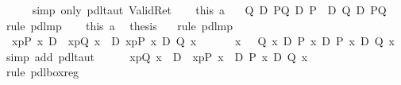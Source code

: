 \begin{isabellebody}
\ \ \ \ \isamarkupfalse%
\ {\isacharparenleft}simp\ only{\isacharcolon}\ pdl{\isacharunderscore}taut\ Valid{\isacharunderscore}Ret{\isacharparenright}\isanewline
\ \ \isamarkupfalse%
\ this\ a{}\ \isamarkupfalse%
\ {\isachardoublequote}{\isasymturnstile}\ {\isacharparenleft}{\isacharquery}Q\ {\isasymlongrightarrow}\isactrlsub D\ {\isacharquery}PQ{\isacharparenright}\ {\isasymlongrightarrow}\isactrlsub D\ {\isacharparenleft}{\isacharquery}P\ \ {\isasymor}\isactrlsub D\ {\isacharquery}Q\ {\isasymlongrightarrow}\isactrlsub D\ {\isacharquery}PQ{\isacharparenright}{\isachardoublequote}\ \isamarkupfalse%
\ {\isacharparenleft}rule\ pdl{\isacharunderscore}mp{\isacharparenright}\isanewline
\ \ \isamarkupfalse%
\ this\ a{}\ \isamarkupfalse%
\ {\isacharquery}thesis\ \ \isamarkupfalse%
\ {\isacharparenleft}rule\ pdl{\isacharunderscore}mp{\isacharparenright}\isanewline
\isamarkupfalse%
\isanewline
\isanewline
\isamarkupfalse%
\ {\isachardoublequote}{\isasymturnstile}\ {\isasymlangle}x{\isasymleftarrow}p{\isasymrangle}{\isacharparenleft}P\ x{\isacharparenright}\ {\isasymand}\isactrlsub D\ {\isacharbrackleft}{\isacharhash}\ x{\isasymleftarrow}p{\isacharbrackright}{\isacharparenleft}Q\ x{\isacharparenright}\ \ {\isasymlongrightarrow}\isactrlsub D\ {\isasymlangle}x{\isasymleftarrow}p{\isasymrangle}{\isacharparenleft}P\ x\ {\isasymand}\isactrlsub D\ Q\ x{\isacharparenright}{\isachardoublequote}\isanewline
\isamarkupfalse%
\ {\isacharminus}\isanewline
\ \ \isamarkupfalse%
\ {\isachardoublequote}\ {\isasymforall}x{\isachardot}\ \ {\isasymturnstile}\ Q\ x\ {\isasymlongrightarrow}\isactrlsub D\ P\ x\ {\isasymlongrightarrow}\isactrlsub D\ P\ x\ {\isasymand}\isactrlsub D\ Q\ x{\isachardoublequote}\ \isamarkupfalse%
\ {\isacharparenleft}simp\ add{\isacharcolon}\ pdl{\isacharunderscore}taut{\isacharparenright}\isanewline
\ \ \isamarkupfalse%
\ {\isachardoublequote}{\isasymturnstile}\ {\isacharbrackleft}{\isacharhash}\ x{\isasymleftarrow}p{\isacharbrackright}{\isacharparenleft}Q\ x{\isacharparenright}\ \ {\isasymlongrightarrow}\isactrlsub D\ {\isacharbrackleft}{\isacharhash}\ x{\isasymleftarrow}p{\isacharbrackright}{\isacharparenleft}P\ x\ \ {\isasymlongrightarrow}\isactrlsub D\ P\ x\ {\isasymand}\isactrlsub D\ Q\ x{\isacharparenright}{\isachardoublequote}\isanewline
\ \ \ \ \isamarkupfalse%
\ {\isacharparenleft}rule\ pdl{\isacharunderscore}box{\isacharunderscore}reg{\isacharparenright}\isanewline

\end{isabellebody}
